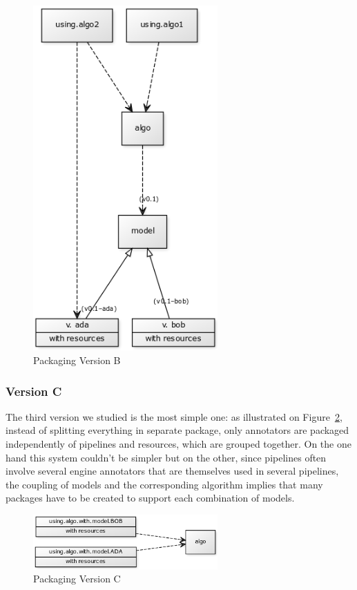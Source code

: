 \documentclass{article}
\begin{document}
\begin{figure}
\centering
\includegraphics[width=200pt]{res/packaging_version_B.png}
\caption{Packaging Version B}
\label{fig:pkgsysB}
\end{figure}


\subsubsection{Version C}

The third version we studied is the most simple one: as illustrated on Figure~\ref{fig:pkgsysC}, instead of splitting everything in separate package, only annotators are packaged independently of pipelines and resources, which are grouped together. On the one hand this system couldn't be simpler but on the other, since pipelines often involve several engine annotators that are themselves used in several pipelines, the coupling of models and the corresponding algorithm implies that many packages have to be created to support each combination of models.


\begin{figure}
\centering
\includegraphics[width=200pt]{res/packaging_version_C.png}
\caption{Packaging Version C}
\label{fig:pkgsysC}
\end{figure}
\end{document}
